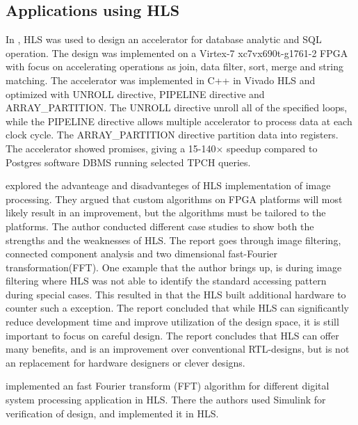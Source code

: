 \subsection{Applications using HLS}
In \citep{Malazgirt:2015:HLS:2889287.2889299}, HLS was used to design an accelerator for database analytic and SQL operation. The design was implemented on a Virtex-7 xc7vx690t-g1761-2 FPGA with focus on accelerating operations as join, data filter, sort, merge and string matching. The accelerator was implemented in C++ in Vivado HLS and optimized with UNROLL directive, PIPELINE directive and ARRAY\_PARTITION. The UNROLL directive unroll all of the specified loops, while the PIPELINE directive allows multiple accelerator to process data at each clock cycle. The ARRAY\_PARTITION directive partition data into registers.  The accelerator showed promises, giving a 15-140$\times$ speedup compared to Postgres software DBMS running selected TPC\-H queries. 

\cite{Bailey:2015:ALH:2789116.2789145} explored the advanteage and disadvanteges of HLS implementation of image processing. They argued that custom algorithms on FPGA platforms will most likely result in an improvement, but the algorithms must be tailored to the platforms. The author conducted different case studies to show both the strengths and the weaknesses of HLS. The report goes through image filtering, connected component analysis and two dimensional fast-Fourier transformation(FFT). One example that the author brings up, is during image filtering where HLS was not able to identify the standard accessing pattern during special cases. This resulted in that the HLS built additional hardware to counter such a exception. The report concluded that while HLS can significantly reduce development time and improve utilization of the design space, it is still important to focus on careful design.  The report concludes that HLS can offer many benefits, and is an improvement over conventional RTL-designs, but is not an replacement for hardware designers or clever designs. 

\cite{Butt:2016:DPH:2888407.2871737} implemented an fast Fourier transform (FFT) algorithm for different digital system processing application in HLS. There the authors used Simulink for verification of design, and implemented it in HLS.

